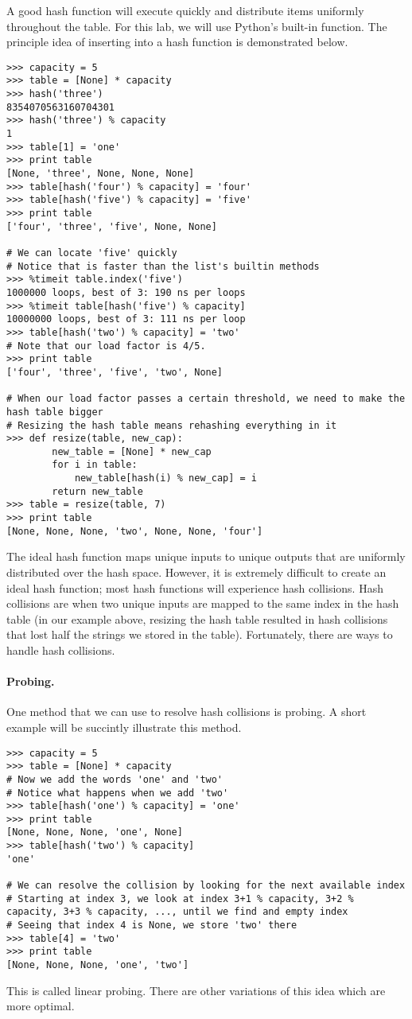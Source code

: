 A good hash function will execute quickly and distribute items uniformly throughout the table.
For this lab, we will use Python's built-in  function.
The principle idea of inserting into a hash function is demonstrated below.
\begin{lstlisting}
>>> capacity = 5
>>> table = [None] * capacity
>>> hash('three')
8354070563160704301
>>> hash('three') % capacity
1
>>> table[1] = 'one'
>>> print table
[None, 'three', None, None, None]
>>> table[hash('four') % capacity] = 'four'
>>> table[hash('five') % capacity] = 'five'
>>> print table
['four', 'three', 'five', None, None]

# We can locate 'five' quickly
# Notice that is faster than the list's builtin methods
>>> %timeit table.index('five')
1000000 loops, best of 3: 190 ns per loops
>>> %timeit table[hash('five') % capacity]
10000000 loops, best of 3: 111 ns per loop
>>> table[hash('two') % capacity] = 'two'
# Note that our load factor is 4/5.
>>> print table
['four', 'three', 'five', 'two', None]

# When our load factor passes a certain threshold, we need to make the hash table bigger
# Resizing the hash table means rehashing everything in it
>>> def resize(table, new_cap):
        new_table = [None] * new_cap
        for i in table:
            new_table[hash(i) % new_cap] = i
        return new_table
>>> table = resize(table, 7)
>>> print table
[None, None, None, 'two', None, None, 'four']
\end{lstlisting}

The ideal hash function maps unique inputs to unique outputs that are uniformly distributed over the hash space.
However, it is extremely difficult to create an ideal hash function; most hash functions will experience hash collisions.
Hash collisions are when two unique inputs are mapped to the same index in the hash table (in our example above, resizing the hash table resulted in hash collisions that lost half the strings we stored in the table).
Fortunately, there are ways to handle hash collisions.

\paragraph{Probing.}
One method that we can use to resolve hash collisions is probing.
A short example will be succintly illustrate this method.
\begin{lstlisting}
>>> capacity = 5
>>> table = [None] * capacity
# Now we add the words 'one' and 'two'
# Notice what happens when we add 'two'
>>> table[hash('one') % capacity] = 'one'
>>> print table
[None, None, None, 'one', None]
>>> table[hash('two') % capacity]
'one'

# We can resolve the collision by looking for the next available index
# Starting at index 3, we look at index 3+1 % capacity, 3+2 % capacity, 3+3 % capacity, ..., until we find and empty index
# Seeing that index 4 is None, we store 'two' there
>>> table[4] = 'two'
>>> print table
[None, None, None, 'one', 'two']
\end{lstlisting}
This is called linear probing.  
There are other variations of this idea which are more optimal.

